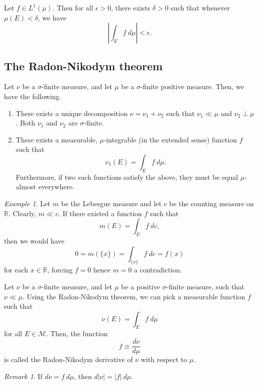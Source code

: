 \documentclass[11pt]{article}
\newcommand{\R}{\mathbb{R}}
\newcommand{\M}{\mathcal{M}}
\theoremstyle{definition}
\theoremstyle{remark}
\newtheorem*{remark}{Remark}
\newtheorem*{example}{Example}
\begin{document}
    \begin{corollary}
        Let $f\in L^1(\mu)$. Then for all $\epsilon > 0$, there exists $\delta > 0$
        such that whenever $\mu(E) < \delta$, we have \[
            |\int_E f \:d\mu| < \epsilon.
        \]
    \end{corollary}



    \subsection{The Radon-Nikodym theorem}

    \begin{theorem}
        Let $\nu$ be a $\sigma$-finite measure, and let $\mu$ be a $\sigma$-finite
        positive measure. Then, we have the following. \begin{enumerate}
            \item There exists a unique decomposition $\nu = \nu_1 + \nu_2$ such that
            $\nu_1 \ll \mu$ and $\nu_2 \perp \mu$. Both $\nu_1$ and $\nu_2$ are
            $\sigma$-finite.

            \item There exists a measurable, $\mu$-integrable (in the extended sense)
            function $f$ such that \[
                \nu_1(E) = \int_E f \:d\mu.
            \] Furthermore, if two such functions satisfy the above, they must be
            equal $\mu$-almost everywhere.
        \end{enumerate}
    \end{theorem}
    \begin{example}
        Let $m$ be the Lebesgue measure and let $c$ be the counting measure on $\R$.
        Clearly, $m \ll c$. If there existed a function $f$ such that \[
            m(E) = \int_E f \:dc,
        \] then we would have \[
            0 = m(\{x\}) = \int_{\{x\}} f\:dc = f(x)
        \] for each $x \in \R$, forcing $f = 0$ hence $m = 0$ a contradiction.
    \end{example}

    \begin{definition}
        Let $\nu$ be a $\sigma$-finite measure, and let $\mu$ be a positive
        $\sigma$-finite measure, such that $\nu \ll \mu$. Using the Radon-Nikodym
        theorem, we can pick a measurable function $f$ such that \[
            \nu(E) = \int_E f \:d\mu
        \] for all $E \in \M$. Then, the function \[
            f \equiv \frac{d\nu}{d\mu}
        \] is called the Radon-Nikodym derivative of $\nu$ with respect to $\mu$.

        \begin{remark}
            If $d\nu = f\:d\mu$, then $d|\nu| = |f|\:d\mu$.
        \end{remark}
    \end{definition}
\end{document}
